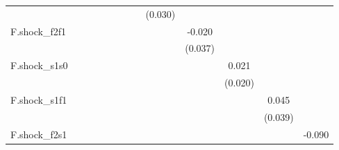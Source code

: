 {\begin{tabular}{l*{12}{c}}
            &                     &                     &                     &                     &                     &                     &                     &     (0.030)         &                     &                     &                     &                     \\
\addlinespace
F.shock\_f2f1&                     &                     &                     &                     &                     &                     &                     &                     &      -0.020         &                     &                     &                     \\
            &                     &                     &                     &                     &                     &                     &                     &                     &     (0.037)         &                     &                     &                     \\
\addlinespace
F.shock\_s1s0&                     &                     &                     &                     &                     &                     &                     &                     &                     &       0.021         &                     &                     \\
            &                     &                     &                     &                     &                     &                     &                     &                     &                     &     (0.020)         &                     &                     \\
\addlinespace
F.shock\_s1f1&                     &                     &                     &                     &                     &                     &                     &                     &                     &                     &       0.045         &                     \\
            &                     &                     &                     &                     &                     &                     &                     &                     &                     &                     &     (0.039)         &                     \\
\addlinespace
F.shock\_f2s1&                     &                     &                     &                     &                     &                     &                     &                     &                     &                     &                     &      -0.090         \\

\end{tabular}}
